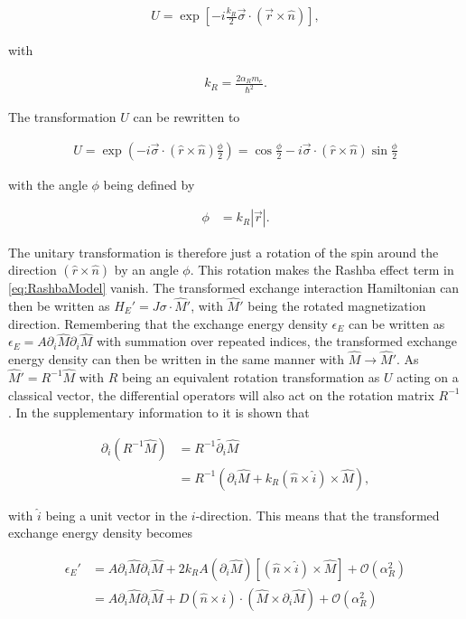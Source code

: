 \documentclass[1p]{elsarticle}		%
\DeclareRobustCommand{\orderof}{\ensuremath{\mathcal{O}}}
\numberwithin{equation}{section}
\begin{document}
\begin{align}
U = \exp{\left[-i \frac{k_R}{2}\vec{\sigma}\cdot(\vec{r}\times\hat{n})\right]},
\end{align}

with

\begin{align}
k_R = \frac{2\alpha_R m_e}{\hbar^2}.
\end{align}

The transformation $U$ can be rewritten to

\begin{align}
U = \exp{(-i\vec{\sigma}\cdot(\hat{r}\times\hat{n}) \frac{\phi}{2})} = \cos{\frac{\phi}{2}} - i\vec{\sigma}\cdot(\hat{r}\times\hat{n})\sin{\frac{\phi}{2}}
\end{align}

with the angle $\phi$ being defined by

\begin{align}
\phi &= k_R |\vec{r}|.
\end{align}

The unitary transformation is therefore just a rotation of the spin around the direction $(\hat{r}\times\hat{n})$ by an angle $\phi$. This rotation makes the Rashba effect term in \eqref{eq:RashbaModel} vanish. The transformed exchange interaction Hamiltonian can then be written as $H_E' = J\sigma\cdot\hat{M}'$, with $\hat{M}'$ being the rotated magnetization direction. Remembering that the exchange energy density $\epsilon_E$ can be written as $\epsilon_E = A \partial_i \hat{M} \partial_i \hat{M}$ with summation over repeated indices, the transformed exchange energy density can then be written in the same manner with $\hat{M} \rightarrow \hat{M}'$. As $\hat{M}' = R^{-1}\hat{M}$ with $R$ being an equivalent rotation transformation as $U$ acting on a classical vector, the differential operators will also act on the rotation matrix $R^{-1}$. In the supplementary information to \cite{DMIfromRashba_Kim} it is shown that

\begin{align}
\partial_i (R^{-1}\hat{M}) &= R^{-1}\tilde{\partial_i} \hat{M} \\
&= R^{-1} (\partial_i\hat{M} + k_R(\hat{n}\times\hat{i})\times\hat{M}),
\end{align}

with $\hat{i}$ being a unit vector in the $i$-direction. This means that the transformed exchange energy density becomes

\begin{align}
\nonumber \epsilon_E' &= A\partial_i \hat{M} \partial_i \hat{M} + 2k_RA(\partial_i\hat{M})\left[(\hat{n}\times\hat{i})\times\hat{M}\right] + \orderof(\alpha_R^2) \\
&= A\partial_i \hat{M} \partial_i \hat{M} + D (\hat{n}\times\hat{i}) \cdot (\hat{M}\times\partial_i\hat{M}) + \orderof(\alpha_R^2) \label{eq:exchEnDensDM}
\end{align}
\end{document}
